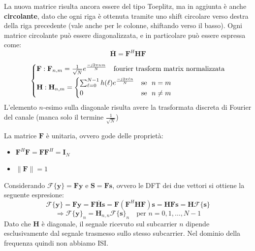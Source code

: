 La nuova matrice risulta ancora essere del tipo Toeplitz, ma in aggiunta è anche \textbf{circolante}, dato che ogni riga è ottenuta tramite uno shift circolare verso destra della riga precedente (vale anche per le colonne, shiftando verso il basso).
Ogni matrice circolante può essere diagonalizzata, e in particolare può essere espressa come:
\[
    \overline{\mathbf{H}} = \mathbf{F}^H \mathbf{H} \mathbf{F}
\]




\[
    \begin{cases*}
        \mathbf{F}: \mathbf{F}_{n, m} = \frac{1}{\sqrt{N}} e^{\frac{-j2\pi nm}{N}} \quad \text{fourier trasform matrix normalizzata} \\
        \mathbf{H}: \mathbf{H}_{n, m} = \begin{cases*}
                                                        \sum_{\ell=0}^{N-1} h(\ell) e^{\frac{-j2\pi \ell n}{N}} & \text{se } $n = m$ \\
                                                        0 & \text{se } $n \neq m$
                                                    \end{cases*}
    \end{cases*}
\]
L'elemento $n$-esimo sulla diagonale risulta avere la trasformata  discreta di Fourier del canale (manca solo il termine $\frac{1}{\sqrt{N}}$)


La matrice $\mathbf{F}$ è unitaria, ovvero gode delle proprietà:
\begin{itemize}
    \item $\mathbf{F}^H \mathbf{F} = \mathbf{F} \mathbf{F}^H = \mathbf{I}_N$
    \item $\| \mathbf{F} \| = 1$ 
\end{itemize}

Considerando $\mathcal{F}\{\mathbf{y}\} = \mathbf{F} \mathbf{y}$ e $\mathbf{S} = \mathbf{F} \mathbf{s}$, ovvero le DFT dei due vettori si ottiene la seguente espresione:
\[
    \mathcal{F}\{\mathbf{y}\} = \mathbf{F} \mathbf{y} = \mathbf{F} \mathbf{\overline{H}} \mathbf{s} = \mathbf{F} \left(\mathbf{F}^H \mathbf{H} \mathbf{F}\right)\mathbf{s} =  \mathbf{H} \mathbf{F} \mathbf{s} = \mathbf{H} \mathcal{F}\{\mathbf{s}\}
\]
\[
    \Rightarrow \mathcal{F}\{\mathbf{y}\}_{n} = \mathbf{H}_{n,n} \mathcal{F}\{\mathbf{s}\}_{n} \quad \text{per } n = 0, 1, \ldots, N-1
\]
Dato che $\mathbf{H}$ è diagonale, il segnale ricevuto sul subcarrier $n$ dipende esclusivamente dal segnale trasmesso sullo stesso subcarrier. Nel dominio della frequenza quindi non abbiamo ISI.



